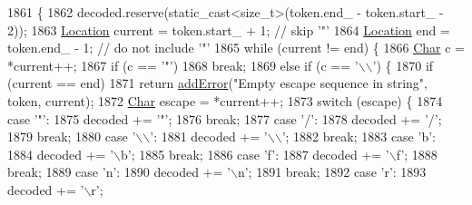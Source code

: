 \begin{DoxyCode}
1861                                                                   \{
1862   decoded.reserve(static\_cast<size\_t>(token.end\_ - token.start\_ - 2));
1863   \hyperlink{class_json_1_1_our_reader_a1bdc7bbc52ba87cae6b19746f2ee0189}{Location} current = token.start\_ + 1; \textcolor{comment}{// skip '"'}
1864   \hyperlink{class_json_1_1_our_reader_a1bdc7bbc52ba87cae6b19746f2ee0189}{Location} end = token.end\_ - 1;       \textcolor{comment}{// do not include '"'}
1865   \textcolor{keywordflow}{while} (current != end) \{
1866     \hyperlink{class_json_1_1_our_reader_a0cd0bab4caa66594ab843ccd5f9dc239}{Char} c = *current++;
1867     \textcolor{keywordflow}{if} (c == \textcolor{charliteral}{'"'})
1868       \textcolor{keywordflow}{break};
1869     \textcolor{keywordflow}{else} \textcolor{keywordflow}{if} (c == \textcolor{charliteral}{'\(\backslash\)\(\backslash\)'}) \{
1870       \textcolor{keywordflow}{if} (current == end)
1871         \textcolor{keywordflow}{return} \hyperlink{class_json_1_1_our_reader_aa6a920311e6408ff3a45324d49da18a6}{addError}(\textcolor{stringliteral}{"Empty escape sequence in string"}, token, current);
1872       \hyperlink{class_json_1_1_our_reader_a0cd0bab4caa66594ab843ccd5f9dc239}{Char} escape = *current++;
1873       \textcolor{keywordflow}{switch} (escape) \{
1874       \textcolor{keywordflow}{case} \textcolor{charliteral}{'"'}:
1875         decoded += \textcolor{charliteral}{'"'};
1876         \textcolor{keywordflow}{break};
1877       \textcolor{keywordflow}{case} \textcolor{charliteral}{'/'}:
1878         decoded += \textcolor{charliteral}{'/'};
1879         \textcolor{keywordflow}{break};
1880       \textcolor{keywordflow}{case} \textcolor{charliteral}{'\(\backslash\)\(\backslash\)'}:
1881         decoded += \textcolor{charliteral}{'\(\backslash\)\(\backslash\)'};
1882         \textcolor{keywordflow}{break};
1883       \textcolor{keywordflow}{case} \textcolor{charliteral}{'b'}:
1884         decoded += \textcolor{charliteral}{'\(\backslash\)b'};
1885         \textcolor{keywordflow}{break};
1886       \textcolor{keywordflow}{case} \textcolor{charliteral}{'f'}:
1887         decoded += \textcolor{charliteral}{'\(\backslash\)f'};
1888         \textcolor{keywordflow}{break};
1889       \textcolor{keywordflow}{case} \textcolor{charliteral}{'n'}:
1890         decoded += \textcolor{charliteral}{'\(\backslash\)n'};
1891         \textcolor{keywordflow}{break};
1892       \textcolor{keywordflow}{case} \textcolor{charliteral}{'r'}:
1893         decoded += \textcolor{charliteral}{'\(\backslash\)r'};

\end{DoxyCode}
